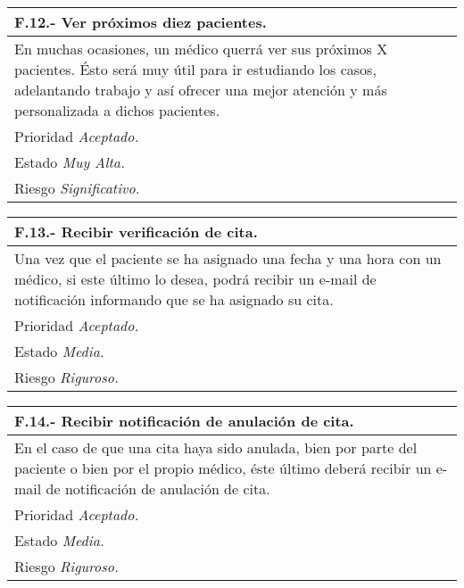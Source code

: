 	\begin{center}
	\begin{tabulary}{15cm}{|L|}
		\hline
			\bf{F.12.- Ver próximos diez pacientes.} \\
		\hline
			En muchas ocasiones, un médico querrá ver sus próximos X pacientes. Ésto será muy útil para ir estudiando los casos, adelantando trabajo y así ofrecer una mejor atención y más personalizada a dichos pacientes. \\
		\hline
			Prioridad \textit{Aceptado.} \\
		\hline
			Estado \textit{Muy Alta.} \\
		\hline
			Riesgo \textit{Significativo.} \\
		\hline
	\end{tabulary}
	\end{center}

	\begin{center}
	\begin{tabulary}{15cm}{|L|}
		\hline
			\bf{F.13.- Recibir verificación de cita.} \\
		\hline
			Una vez que el paciente se ha asignado una fecha y una hora con un médico, si este último lo desea, podrá recibir un e-mail de notificación informando que se ha asignado su cita. \\
		\hline
			Prioridad \textit{Aceptado.} \\
		\hline
			Estado \textit{Media.} \\
		\hline
			Riesgo \textit{Riguroso.} \\
		\hline
	\end{tabulary}
	\end{center}

	\begin{center}
	\begin{tabulary}{15cm}{|L|}
		\hline
			\bf{F.14.- Recibir notificación de anulación de cita.} \\
		\hline
			En el caso de que una cita haya sido anulada, bien por parte del paciente o bien por el propio médico, éste último deberá recibir un e-mail de notificación de anulación de cita. \\
		\hline
			Prioridad \textit{Aceptado.} \\
		\hline
			Estado \textit{Media.} \\
		\hline
			Riesgo \textit{Riguroso.} \\
		\hline
	\end{tabulary}
	\end{center}


